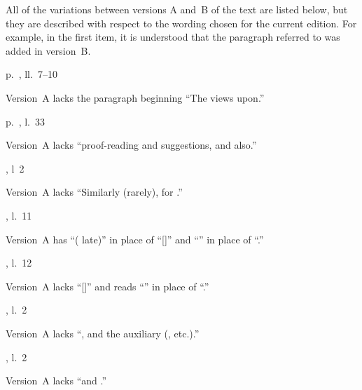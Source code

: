 
\label{variations}
\markthird{}

\thispagestyle{dropfolio}


All of the variations between versions A and~B of the text are listed
below, but they are described with respect to the wording chosen for
the current edition.  For example, in the first item, it is understood
that the paragraph referred to was added in version~B.

\begin{variations}

\item[p.~\pagelink{vi}, ll.~7–10]

Version~A lacks the paragraph beginning “The views upon.”

\item[p.~\pagelink{vi}, l.~33]

Version~A lacks “proof-reading and suggestions, and also.”

\item[{\xref[3.]{100}, l~2}]

Version~A lacks “Similarly (rarely),  for .”

\item[\xref{122}, l.~11]

Version~A has “( late)” in place of “[]” and “” in place of “.”

\item[\xref{122}, l.~12]

Version~A lacks “[]” and reads “” in place of “.”

\item[{\xref[\emph{a}]{22}, l.~2}]

Version~A lacks “, and the auxiliary  (,
etc.).”

\item[{\xref[\emph{b}]{234}, l.~2}]

Version~A lacks “and .”

\item[{\xref[5, \emph{c}]{240}}]


\end{variations}
